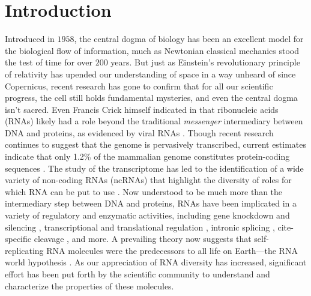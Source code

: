 
\chapter{Introduction}
\label{ch:intro}


Introduced in $1958$, the central dogma of biology has been an excellent model for
the biological flow of information, much as Newtonian classical mechanics stood the
test of time for over $200$ years. But just as Einstein’s revolutionary principle of
relativity has upended our understanding of space in a way unheard of since
Copernicus, recent research has gone to confirm that for all our scientific
progress, the cell still holds fundamental mysteries, and even the central dogma
isn't sacred. Even Francis Crick himself indicated in \citep{crick:1970wb} that
ribonucleic acids (RNAs) likely had a role beyond the traditional {\em messenger}
intermediary between
DNA and proteins, as evidenced by viral RNAs \citep{coffin:1997ws}. Though recent
research continues to suggest that the genome is pervasively transcribed, current
estimates indicate that only 1.2\% of the mammalian genome constitutes
protein-coding sequences \citep{berretta:2009tq,clark:2011cc,jensen:2013vb}. The
study of the transcriptome has led to the identification of a wide variety of
non-coding RNAs (ncRNAs) that highlight the diversity of roles for which RNA can
be put to use \citep{costa:2005ug}. Now understood to be much more than the
intermediary step between DNA and proteins, RNAs have been implicated in a variety
of regulatory and enzymatic activities, including gene knockdown and silencing
\citep{fire:1998tv,mccaffrey:2002tf,hannon:2002vn,he:2004uk},
transcriptional and translational regulation \citep{nudler:2004vm,mandal:2004vh},
intronic splicing \citep{kruger:1982wk,cech:1990tn}, cite-specific cleavage
\citep{doherty:2001wq}, and more.
A prevailing theory now suggests that self-replicating RNA molecules were the
predecessors to all life on Earth---the RNA world hypothesis \citep{gilbert:1986td}.
As our appreciation of RNA diversity has increased,
significant effort has been put forth by the scientific community to understand
and characterize the properties of these molecules.

